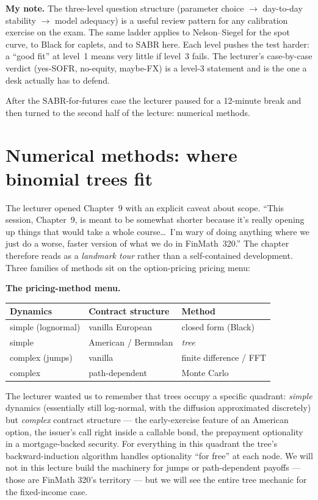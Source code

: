 \begin{checkpoint}
\textbf{My note.} The three-level question structure (parameter
choice $\to$ day-to-day stability $\to$ model adequacy) is a useful
review pattern for any calibration exercise on the exam. The same
ladder applies to Nelson--Siegel for the spot curve, to Black for
caplets, and to SABR here. Each level pushes the test harder: a
``good fit'' at level~1 means very little if level~3 fails. The
lecturer's case-by-case verdict (yes-SOFR, no-equity, maybe-FX) is a
level-3 statement and is the one a desk actually has to defend.
\end{checkpoint}

After the SABR-for-futures case the lecturer paused for a 12-minute
break and then turned to the second half of the lecture: numerical
methods.

\section{Numerical methods: where binomial trees fit}\label{L8-sec:nmframe}

The lecturer opened Chapter~9 with an explicit caveat about scope.
``This session, Chapter~9, is meant to be somewhat shorter because
it's really opening up things that would take a whole course\ldots\
I'm wary of doing anything where we just do a worse, faster version
of what we do in FinMath~320.'' The chapter therefore reads as a
\emph{landmark tour} rather than a self-contained development. Three
families of methods sit on the option-pricing pricing menu:

\begin{keyblock}
\textbf{The pricing-method menu.}
\begin{center}
\small
\begin{tabular}{l|l|l}
\textbf{Dynamics} & \textbf{Contract structure} & \textbf{Method} \\
\hline
simple (lognormal) & vanilla European & closed form (Black) \\
simple             & American / Bermudan & \emph{tree} \\
complex (jumps)    & vanilla            & finite difference / FFT \\
complex            & path-dependent     & Monte Carlo \\
\end{tabular}
\end{center}
\end{keyblock}

The lecturer wanted us to remember that trees occupy a specific
quadrant: \emph{simple} dynamics (essentially still log-normal, with
the diffusion approximated discretely) but \emph{complex} contract
structure --- the early-exercise feature of an American option,
the issuer's call right inside a callable bond, the prepayment
optionality in a mortgage-backed security. For everything in this
quadrant the tree's backward-induction algorithm handles optionality
``for free'' at each node. We will not in this lecture build the
machinery for jumps or path-dependent payoffs --- those are FinMath
320's territory --- but we will see the entire tree mechanic for the
fixed-income case.

